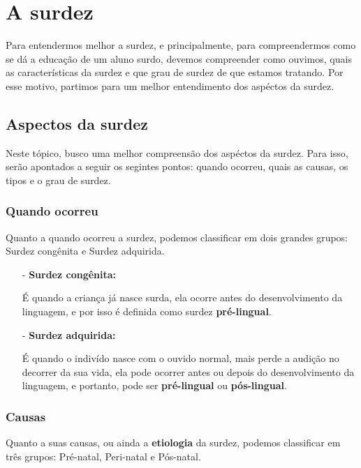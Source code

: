 \documentclass[brasil]{abnt}
\begin{document}
\anexo

\chapter{A surdez}
	Para entendermos melhor a surdez, e principalmente, para compreendermos como se dá a educação de um aluno surdo, devemos compreender como ouvimos, quais as características da surdez e 
	que grau de surdez de que estamos tratando. Por esse motivo, partimos para um melhor entendimento dos aspéctos da surdez.	
			
		\section{Aspectos da surdez}
			Neste tópico, busco uma melhor compreensão dos aspéctos da surdez. Para isso, serão apontados a seguir os segintes pontos: quando ocorreu, 
			quais as causas, os tipos e o grau de surdez. 
			
			\subsection{Quando ocorreu}
				Quanto a quando ocorreu a surdez, podemos classificar em dois grandes grupos: Surdez congênita e Surdez adquirida. 
				
				\begin{itemize}		
					\item [-]\textbf{Surdez congênita:} 
					
						É quando a criança já nasce surda, ela ocorre antes do desenvolvimento da linguagem, e por isso é definida como 
						surdez \textbf{pré-lingual}. 
						
					\item[-]\textbf{Surdez adquirida:} 
					
						É quando o indivído nasce com o ouvido normal, mais perde a audição no decorrer da sua vida, ela pode ocorrer antes ou depois do 
						desenvolvimento da linguagem, e portanto, pode ser \textbf{pré-lingual} ou \textbf{pós-lingual}.
				\end{itemize}
				
				
			\subsection{Causas}
				Quanto a suas causas, ou ainda a \textbf{etiologia} da surdez, podemos classificar em três grupos: Pré-natal, Peri-natal e Pós-natal.
			
\end{document}

